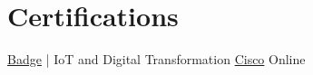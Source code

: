 \section{Certifications}
{{\href{https://www.credly.com/badges/b6d025da-4d2a-4ead-ac76-39b07741ecb8/public_url}{\color{blue}Badge}} | IoT and Digital Transformation}
{\href{https://www.cisco.com/}{\color{blue}Cisco}}
{Online}
{}


